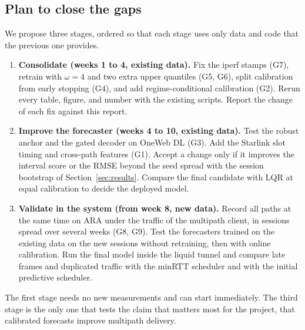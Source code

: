 \subsection{Plan to close the gaps}
We propose three stages, ordered so that each stage uses only data and code that the previous one provides.
\begin{enumerate}[leftmargin=*]
  \item \textbf{Consolidate (weeks 1 to 4, existing data).} Fix the iperf stamps (G7), retrain with $\omega=4$ and two extra upper quantiles (G5, G6), split calibration from early stopping (G4), and add regime-conditional calibration (G2). Rerun every table, figure, and number with the existing scripts. Report the change of each fix against this report.
  \item \textbf{Improve the forecaster (weeks 4 to 10, existing data).} Test the robust anchor and the gated decoder on OneWeb DL (G3). Add the Starlink slot timing and cross-path features (G1). Accept a change only if it improves the interval score or the RMSE beyond the seed spread with the session bootstrap of Section~\ref{sec:results}. Compare the final candidate with LQR at equal calibration to decide the deployed model.
  \item \textbf{Validate in the system (from week 8, new data).} Record all paths at the same time on ARA under the traffic of the multipath client, in sessions spread over several weeks (G8, G9). Test the forecasters trained on the existing data on the new sessions without retraining, then with online calibration. Run the final model inside the liquid tunnel and compare late frames and duplicated traffic with the minRTT scheduler and with the initial predictive scheduler.
\end{enumerate}
The first stage needs no new measurements and can start immediately. The third stage is the only one that tests the claim that matters most for the project, that calibrated forecasts improve multipath delivery.
